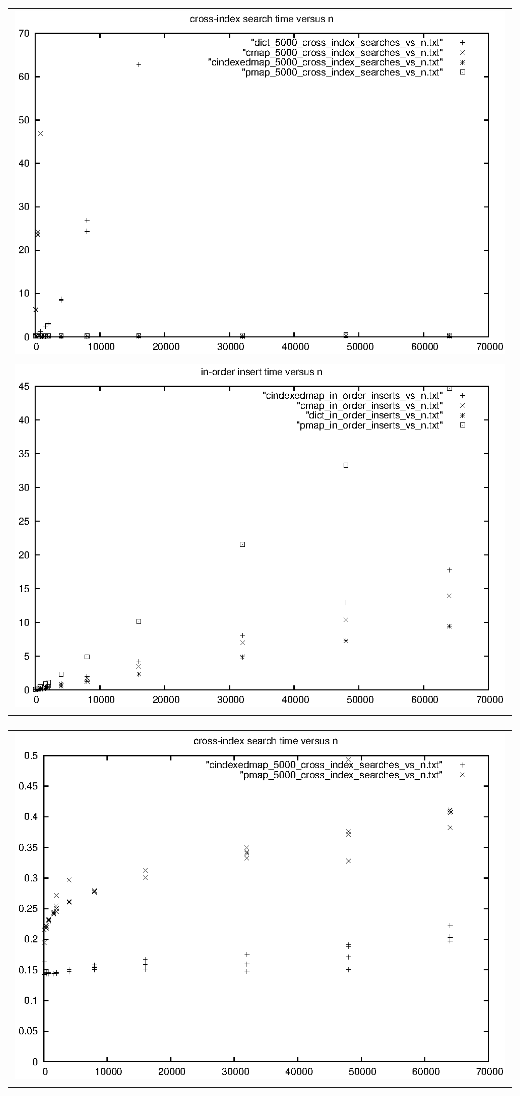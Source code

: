 \documentclass[11pt]{article}
\begin{document}
\begin{tabular}{c}
\includegraphics[width=6in]{cross_index_search_time_vs_n} \\
\includegraphics[width=6in]{in_order_insert_time_vs_n} \\
\end{tabular}

\begin{tabular}{c}
\includegraphics[width=6in]{cross_wo_dict_vs_n} \\
\end{tabular}
\end{document}
